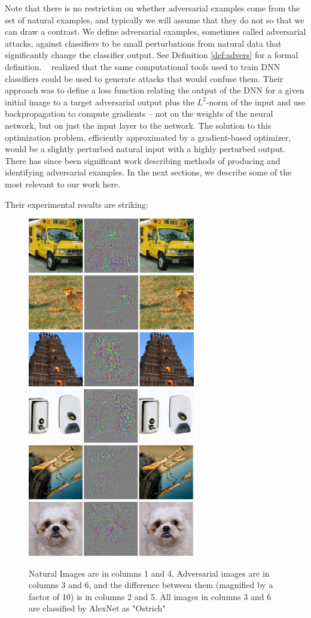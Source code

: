 Note that there is no restriction on whether adversarial examples come from the set of natural examples, and typically we will assume that they do not so that we can draw a contrast. 
We define adversarial examples, sometimes called adversarial attacks, against classifiers
to be small perturbations from natural data that significantly change the classifier output. See Definition \ref{def:advers} for a formal definition.
~\citet{szegedy2013} realized that the same computational tools
used to train DNN classifiers could be used to generate attacks that would
confuse them. Their approach was to define a loss function
relating the output of the DNN for a given initial image to a target adversarial 
output plus the $L^2$-norm of the input and use backpropagation to 
compute gradients -- not on the weights of the neural network, but on
just the input layer to the network. The solution to this optimization
problem, efficiently approximated by a gradient-based optimizer, would
be a slightly perturbed natural input with a highly perturbed
output. There has since been significant work describing methods of producing and identifying
adversarial examples. In the next sections, we describe some of the most relevant
to our work here.

Their experimental results are striking:\\

\begin{figure}[t]
   \centering
\includegraphics[width=7.3cm]{negative1.png}\includegraphics[width=7.3cm]{negative2.png}
   \caption{Natural Images are in columns 1 and 4, Adversarial images are in columns 3 and 6, and the difference between them (magnified by a factor of 10) is in columns 2 and 5. All images in columns 3 and 6 are classified by AlexNet as "Ostrich" ~\citep{szegedy2013}}
   \label{fig:my_label}
\end{figure}

